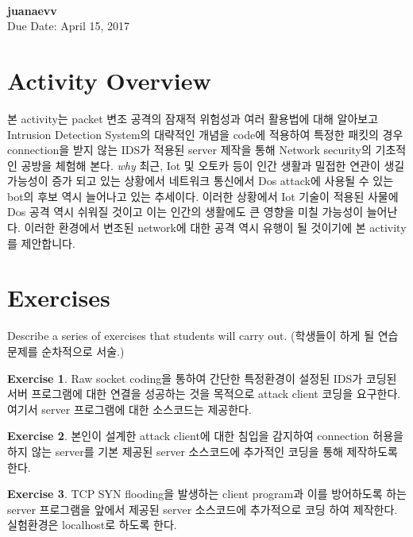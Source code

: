 \documentclass[a4paper, 11pt]{article}
\theoremstyle{definition}
\newtheorem{exercise}{Exercise}
\begin{document}
 \\
         {\phantom{} \hfill \textbf{juanaevv}} \\
         {\phantom{} \hfill Due Date: April 15, 2017} \\

\section{Activity Overview}

본 activity는 packet 변조 공격의 잠재적 위험성과 여러 활용법에 대해 알아보고 Intrusion Detection System의 대략적인 개념을 code에 적용하여 특정한 패킷의 경우 connection을 받지 않는 IDS가 적용된 server 제작을 통해 Network security의 기초적인 공방을 체험해 본다.
\emph{why}
최근, Iot 및 오토카 등이 인간 생활과 밀접한 연관이 생길 가능성이 증가 되고 있는 상황에서 네트워크 통신에서 Dos attack에 사용될 수 있는 bot의 후보 역시 늘어나고 있는 추세이다. 이러한 상황에서 Iot 기술이 적용된 사물에 Dos 공격 역시 쉬워질 것이고 이는 인간의 생활에도 큰 영향을 미칠 가능성이 늘어난다. 이러한 환경에서 변조된 network에 대한 공격 역시 유행이 될 것이기에 본 activity를 제안합니다.

\section{Exercises}

Describe a series of exercises that students will carry out. (학생들이 하게
될 연습문제를 순차적으로 서술.)

\begin{exercise}

  Raw socket coding을 통하여 간단한 특정환경이 설정된 IDS가 코딩된 서버 프로그램에 대한 연결을 성공하는 것을 목적으로 attack client 코딩을 요구한다. 여기서 server 프로그램에 대한 소스코드는 제공한다.

\end{exercise}

\begin{exercise}

  본인이 설계한 attack client에 대한 침입을 감지하여 connection 허용을 하지 않는 server를 기본 제공된 server 소스코드에 추가적인 코딩을 통해 제작하도록 한다.

\end{exercise}

\begin{exercise}

  TCP SYN flooding을 발생하는 client program과 이를 방어하도록 하는 server 프로그램을 앞에서 제공된 server 소스코드에 추가적으로 코딩 하여 제작한다. 실험환경은 localhost로 하도록 한다.

\end{exercise}
\end{document}
